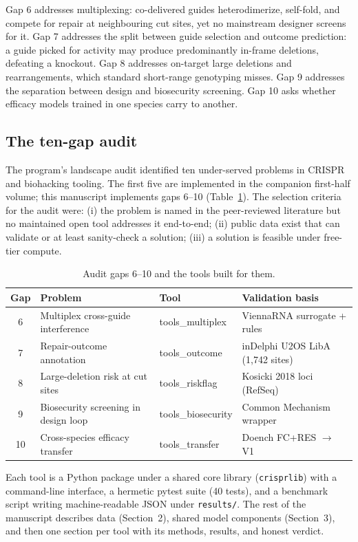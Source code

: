 \documentclass[12pt]{article}
\begin{document}
Gap 6 addresses multiplexing: co-delivered guides heterodimerize, self-fold,
and compete for repair at neighbouring cut sites, yet no mainstream designer
screens for it. Gap 7 addresses the split between guide selection and outcome
prediction: a guide picked for activity may produce predominantly in-frame
deletions, defeating a knockout. Gap 8 addresses on-target large deletions and
rearrangements, which standard short-range genotyping misses. Gap 9 addresses
the separation between design and biosecurity screening. Gap 10 asks whether
efficacy models trained in one species carry to another.

\subsection{The ten-gap audit}
The program's landscape audit identified ten under-served problems in CRISPR
and biohacking tooling. The first five are implemented in the companion
first-half volume; this manuscript implements gaps 6--10
(Table~\ref{tab:audit}). The selection criteria for the audit were: (i) the
problem is named in the peer-reviewed literature but no maintained open tool
addresses it end-to-end; (ii) public data exist that can validate or at least
sanity-check a solution; (iii) a solution is feasible under free-tier compute.
\begin{table}[h]\centering
\caption{Audit gaps 6--10 and the tools built for them.}\label{tab:audit}
\begin{tabular}{clll}\hline\hline
Gap & Problem & Tool & Validation basis \\\hline
6 & Multiplex cross-guide interference & tools\_multiplex & ViennaRNA surrogate + rules \\
7 & Repair-outcome annotation & tools\_outcome & inDelphi U2OS LibA (1,742 sites) \\
8 & Large-deletion risk at cut sites & tools\_riskflag & Kosicki 2018 loci (RefSeq) \\
9 & Biosecurity screening in design loop & tools\_biosecurity & Common Mechanism wrapper \\
10 & Cross-species efficacy transfer & tools\_transfer & Doench FC+RES $\to$ V1 \\\hline\hline
\end{tabular}
\end{table}

Each tool is a Python package under a shared core library (\texttt{crisprlib})
with a command-line interface, a hermetic pytest suite (40 tests), and a
benchmark script writing machine-readable JSON under \texttt{results/}. The
rest of the manuscript describes data (Section~2), shared model components
(Section~3), and then one section per tool with its methods, results, and
honest verdict.
\end{document}
